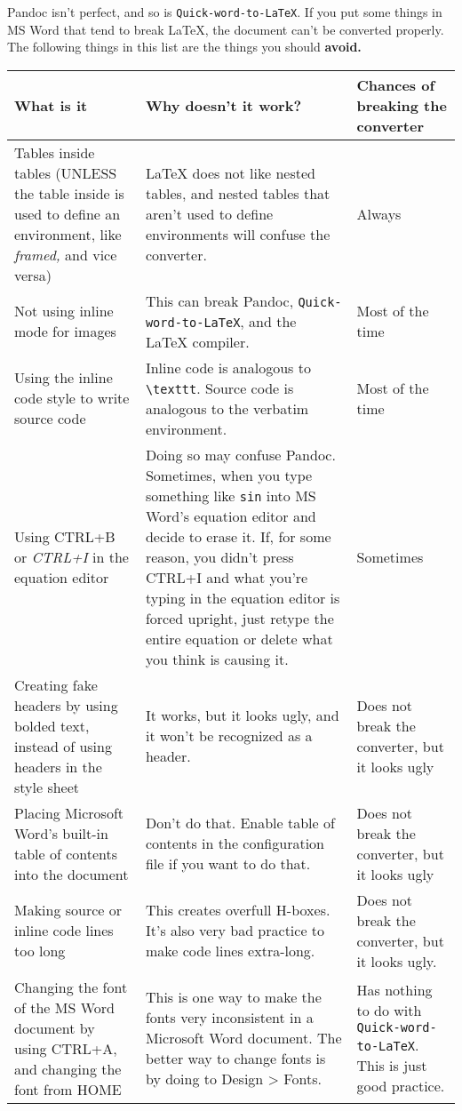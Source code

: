 \documentclass[12pt]{article}
\theoremstyle{plain}
\theoremstyle{remark}
\theoremstyle{definition}
\begin{document}
Pandoc isn't perfect, and so is \texttt{Quick-word-to-LaTeX}. If you put
some things in MS Word that tend to break LaTeX, the document can't be
converted properly. The following things in this list are the things you
should \textbf{avoid.}

\begin{table}[H]
\centering


\begin{tabular}{|m{11em}|m{11em}|m{11em}|}

\hline
What is it& Why doesn't it work?& Chances of breaking the converter\\ \hline
Tables inside tables (UNLESS the table inside is used to define an
environment, like \emph{framed,} and vice versa) & LaTeX does not like
nested tables, and nested tables that aren't used to define environments
will confuse the converter. & Always \\ \hline
Not using inline mode for images & This can break Pandoc,
\texttt{Quick-word-to-LaTeX}, and the LaTeX compiler. & Most of the
time \\ \hline
Using the inline code style to write source code & Inline code is
analogous to \texttt{\textbackslash{}texttt}. Source code is analogous
to the verbatim environment. & Most of the time \\ \hline
Using CTRL+B or \emph{CTRL+I} in the equation editor & Doing so may
confuse Pandoc. Sometimes, when you type something like \texttt{sin}
into MS Word's equation editor and decide to erase it. If, for some
reason, you didn't press CTRL+I and what you're typing in the equation
editor is forced upright, just retype the entire equation or delete what
you think is causing it. & Sometimes \\ \hline
Creating fake headers by using bolded text, instead of using headers in
the style sheet & It works, but it looks ugly, and it won't be
recognized as a header. & Does not break the converter, but it looks
ugly \\ \hline
Placing Microsoft Word's built-in table of contents into the document & Don't do that. Enable table of contents in the configuration file if you
want to do that. & Does not break the converter, but it looks ugly \\ \hline
Making source or inline code lines too long & This creates overfull
H-boxes. It's also very bad practice to make code lines extra-long. & Does not break the converter, but it looks ugly. \\ \hline
Changing the font of the MS Word document by using CTRL+A, and changing
the font from HOME & This is one way to make the fonts very inconsistent
in a Microsoft Word document. The better way to change fonts is by doing
to Design \textgreater{} Fonts. & Has nothing to do with
\texttt{Quick-word-to-LaTeX}. This is just good practice.
\\\hline
\end{tabular}

\end{table}
\end{document}
